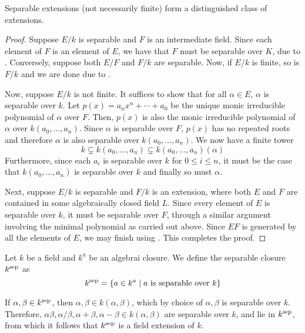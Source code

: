 \begin{theorem}
    Separable extensions (not necessarily finite) form a distinguished class of extensions.
\end{theorem}
\begin{proof}
    Suppose $E/k$ is separable and $F$ is an intermediate field. Since each element of $F$ is an element of $E$, we have that $F$ must be separable over $K$, due to . Conversely, suppose both $E/F$ and $F/k$ are separable. Now, if $E/k$ is finite, so is $F/k$ and we are done due to .

    Now, suppose $E/k$ is not finite. It suffices to show that for all $\alpha\in E$, $\alpha$ is separable over $k$. Let $p(x) = a_nx^n + \cdots + a_0$ be the unique monic irreducible polynomial of $\alpha$ over $F$. Then, $p(x)$ is also the monic irreducible polynomial of $\alpha$ over $k(a_0,\ldots,a_n)$. Since $\alpha$ is separable over $F$, $p(x)$ has no repeated roots and therefore $\alpha$ is also separable over $k(a_0,\ldots,a_n)$. We now have a finite tower 
    \begin{equation*}
        k\subsetneq k(a_0,\ldots,a_n)\subsetneq k(a_0,\ldots,a_n)(\alpha)
    \end{equation*}
    Furthermore, since each $a_i$ is separable over $k$ for $0\le i\le n$, it must be the case that $k(a_0,\ldots,a_n)$ is separable over $k$ and finally so must $\alpha$.

    Next, suppose $E/k$ is separable and $F/k$ is an extension, where both $E$ and $F$ are contained in some algebraically closed field $L$. Since every element of $E$ is separable over $k$, it must be separable over $F$, through a similar argument involving the minimal polynomial as carried out above. Since $EF$ is generated by all the elements of $E$, we may finish using . This completes the proof.
\end{proof}

\begin{definition}
    Let $k$ be a field and $k^a$ be an algebrai closure. We define the separable closure $k^{\text{sep}}$ as 
    \begin{equation*}
        k^{\text{sep}} = \{a\in k^a\mid\text{$a$ is separable over $k$}\}
    \end{equation*}
\end{definition}

If $\alpha,\beta\in k^{\text{sep}}$, then $\alpha,\beta\in k(\alpha,\beta)$, which by choice of $\alpha,\beta$ is separable over $k$. Therefore, $\alpha\beta,\alpha/\beta,\alpha + \beta,\alpha - \beta\in k(\alpha,\beta)$ are separable over $k$, and lie in $k^{\text{sep}}$, from which it follows that $k^{\text{sep}}$ is a field extension of $k$.

